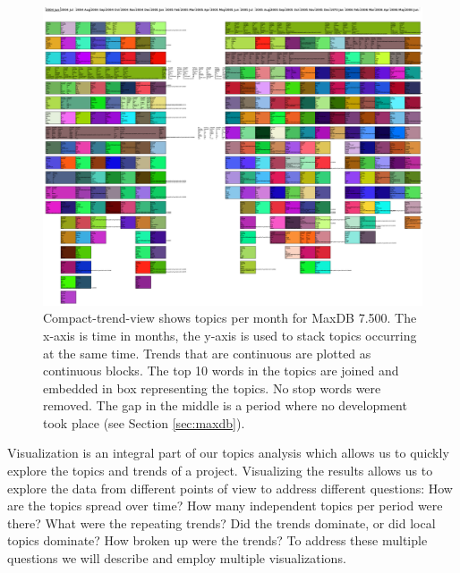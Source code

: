 \documentclass[times, 10pt,twocolumn]{article}
\newcommand{\shrinkit}{\vspace*{-.3em}}
\begin{document}
\begin{figure}
  \centering
  \includegraphics[width=1.0\textwidth]{time-smear-plot}%
  \caption{Compact-trend-view shows topics per month for MaxDB
    7.500. The x-axis is time in months, the y-axis is used to stack
    topics occurring at the same time. Trends that are continuous are
    plotted as continuous blocks. The top 10 words in the topics are
    joined and embedded in box representing the topics. No stop words were removed. The gap in the
    middle is a period where no development took place (see Section \ref{sec:maxdb}).}
  \label{fig:topicsmear}
\end{figure}



\shrinkit
{}
\shrinkit
  Visualization is an integral part of our topics analysis which
  allows us to quickly explore the topics and trends of a project.
  Visualizing the results %
  allows us to explore the
  data from different points of view to address different questions:
  How are the topics spread over time?  How many independent topics
  per period were there?  What were the repeating trends?  Did the
  trends dominate, or did local topics dominate?  How broken up were
  the trends?  
  To address these multiple questions we will describe and employ multiple visualizations.
\end{document}
